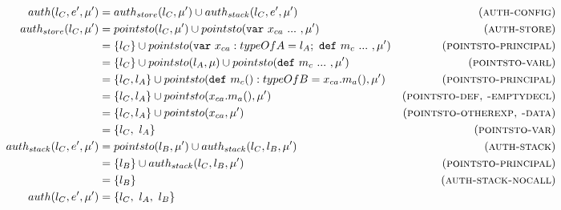 \documentclass{llncs}
\newcommand{\keywadj}[1]{\mathtt{#1}}
\newcommand{\keyw}[1]{\keywadj{#1}~}
\begin{document}
\begin{align*}
auth(l_C, e', \mu') &= auth_{store}(l_C, \mu') \cup auth_{stack}(l_C, e', \mu') & (\textsc{auth-config})\\
auth_{store}(l_C, \mu') &= pointsto(l_C, \mu') \cup pointsto(\keyw{var} x_{ca}~...~, \mu') & (\textsc{auth-store})\\
 &= \{ l_C \} \cup pointsto(\keyw{var} x_{ca} : typeOfA = l_A;~\keyw{def} m_c~...~, \mu') & (\textsc{pointsto-principal})\\
 &= \{ l_C \} \cup pointsto(l_A, \mu) \cup pointsto(\keyw{def} m_c~...~, \mu') & (\textsc{pointsto-varl})\\
 &= \{ l_C, l_A \} \cup pointsto(\keyw{def} m_c() : typeOfB = x_{ca}.m_a(), \mu') & (\textsc{pointsto-principal})\\
 &= \{ l_C, l_A \} \cup pointsto(x_{ca}.m_a(), \mu') & (\textsc{pointsto-def, -emptydecl})\\
 &= \{ l_C, l_A \} \cup pointsto(x_{ca}, \mu') & (\textsc{pointsto-otherexp, -data})\\
 &= \{ l_C,~l_A \} & (\textsc{pointsto-var})\\
auth_{stack}(l_C, e', \mu') &= pointsto(l_B, \mu') \cup auth_{stack}(l_C, l_B, \mu') & (\textsc{auth-stack})\\
 &= \{ l_B \} \cup auth_{stack}(l_C, l_B, \mu') & (\textsc{pointsto-principal})\\
 &= \{ l_B \} & (\textsc{auth-stack-nocall})\\
auth(l_C, e', \mu') &= \{ l_C,~l_A,~l_B \} &\\
\end{align*}
\end{document}
